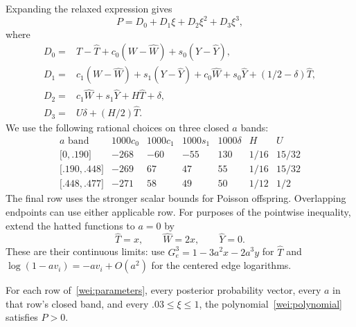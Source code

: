 Expanding the relaxed expression gives
\begin{equation}\label{wei:polynomial}
 P=D_0+D_1\xi+D_2\xi^2+D_3\xi^3,
\end{equation}
where
\begin{align}
 D_0={}&T-\widehat T+c_0(W-\widehat W)+s_0(Y-\widehat Y),\nonumber\\
 D_1={}&c_1(W-\widehat W)+s_1(Y-\widehat Y)
       +c_0\widehat W+s_0\widehat Y+(1/2-\delta)\widehat T,\nonumber\\
 D_2={}&c_1\widehat W+s_1\widehat Y+H\widehat T+\delta,\nonumber\\
 D_3={}&U\delta+(H/2)\widehat T.
 \label{wei:coefficients}
\end{align}
We use the following rational choices on three closed $a$ bands:
\begin{equation}\label{wei:parameters}
\begin{array}{c|rrrr|cc}
 a\text{ band}&1000c_0&1000c_1&1000s_1&1000\delta&H&U\\ \hline
 \bigl[0,.190\bigr]&-268&-60&-55&130&1/16&15/32\\
 \bigl[.190,.448\bigr]&-269&67&47&55&1/16&15/32\\
 \bigl[.448,.477\bigr]&-271&58&49&50&1/12&1/2
\end{array}
\end{equation}
The final row uses the stronger scalar bounds for Poisson offspring.
Overlapping endpoints can use either applicable row.
For purposes of the pointwise inequality, extend the hatted functions
to $a=0$ by
\[
 \widehat T=x,\qquad\widehat W=2x,\qquad\widehat Y=0.
\]
These are their continuous limits: use
$G_e^3=1-3a^2x-2a^3y$ for $\widehat T$ and
$\log(1-av_i)=-av_i+O(a^2)$ for the centered edge logarithms.

\begin{lemma}\label{wei:positive}
For each row of~\eqref{wei:parameters}, every posterior probability
vector, every $a$ in that row's closed band, and every
$.03\le\xi\le1$, the polynomial~\eqref{wei:polynomial} satisfies
$P>0$.
\end{lemma}

